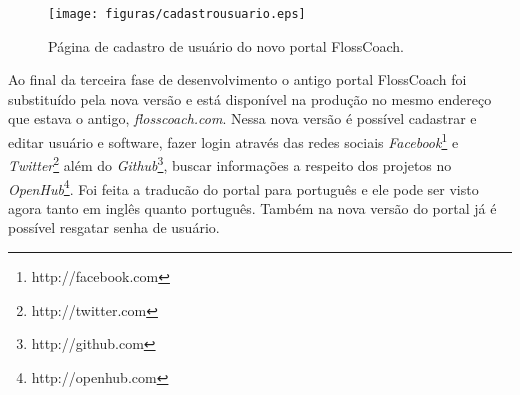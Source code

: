 \begin{figure}[h]
	\centering
	\label{fig:producao}
		\texttt{[image: figuras/cadastrousuario.eps]}
	\caption{Página de cadastro de usuário do novo portal FlossCoach.}
\end{figure}

Ao final da terceira fase de desenvolvimento o antigo portal FlossCoach foi substituído pela
nova versão e está disponível na produção no mesmo endereço que estava o antigo, \textit{flosscoach.com}.
Nessa nova versão é possível cadastrar e editar usuário e software, fazer login através das redes sociais 
\textit{Facebook}\footnote{http://facebook.com} e \textit{Twitter}\footnote{http://twitter.com} além do \textit{Github}\footnote{http://github.com}, 
buscar informações a respeito dos projetos no \textit{OpenHub}\footnote{http://openhub.com}. Foi feita a traducão
do portal para português e ele pode ser visto agora tanto em inglês quanto português. Também na nova 
versão do portal já é possível resgatar senha de usuário.

